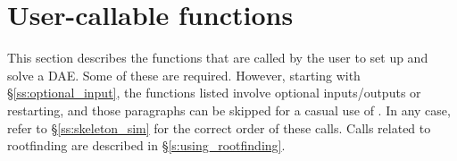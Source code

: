 \section{User-callable functions}
\label{ss:ida_fct_sim}

This section describes the {\ida} functions that are called by the
user to set up and solve a DAE. Some of these are required. However,
starting with \S\ref{ss:optional_input}, the functions listed involve
optional inputs/outputs or restarting, and those paragraphs can be
skipped for a casual use of {\ida}. In any case, refer to
\S\ref{ss:skeleton_sim} for the correct order of these calls.
Calls related to rootfinding are described in \S\ref{s:using_rootfinding}.

